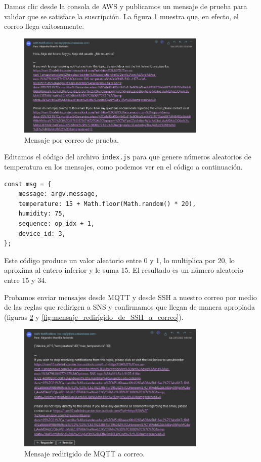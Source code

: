 \documentclass[10pt]{article}
\begin{document}
Damos clic desde la consola de AWS y publicamos un mensaje de prueba para validar que se satisface la suscripción. La figura \ref{fig:mensaje_prueba_correo} muestra que, en efecto, el correo llega exitosamente.

\begin{figure}[H]
    \centering
    \includegraphics[width=0.8\textwidth]{Images/Mensaje_prueba_correo.png}
    \caption{Mensaje por correo de prueba.}
    \label{fig:mensaje_prueba_correo}
\end{figure}

Editamos el código del archivo \texttt{index.js} para que genere números aleatorios de temperatura en los mensajes, como podemos ver en el código a continuación.

\begin{lstlisting}
const msg = {
	message: argv.message,
	temperature: 15 + Math.floor(Math.random() * 20),
	humidity: 75,
	sequence: op_idx + 1,
	device_id: 3,
};
\end{lstlisting}

Este código produce un valor aleatorio entre 0 y 1, lo multiplica por 20, lo aproxima al entero inferior y le suma 15. El resultado es un número aleatorio entre 15 y 34.

Probamos enviar mensajes desde MQTT y desde SSH a nuestro correo por medio de las reglas que redirigen a SNS y confirmamos que llegan de manera apropiada (figuras \ref{fig:mensaje_redirigido_de_MQTT_a_correo} y \ref{fig:mensaje_redirigido_de_SSH_a_correo}).

\begin{figure}[H]
    \centering
    \includegraphics[width=0.8\textwidth]{Images/Mensaje_redirigido_de_MQTT_a_correo.png}
    \caption{Mensaje redirigido de MQTT a correo.}
    \label{fig:mensaje_redirigido_de_MQTT_a_correo}
\end{figure}
\end{document}
